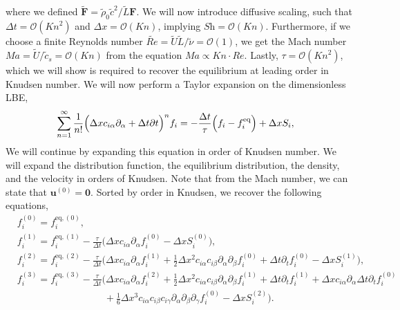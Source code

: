 \documentclass[fleqn,a4paper]{article} %
\numberwithin{equation}{section} %
\numberwithin{figure}{section} %
\numberwithin{table}{section} %
\numberwithin{algorithm}{section} %
\begin{document}
where we defined $\tilde{\bm{F}} = \tilde{\rho}_0 \tilde{c}^2 / \tilde{L} \bm{F}$. We will now introduce diffusive scaling, such that $\Delta t = \mathcal{O}\left(\textit{Kn}^2\right)$ and $\Delta x = \mathcal{O}\left(\textit{Kn}\right)$, implying $\textit{Sh} = \mathcal{O}\left(\textit{Kn}\right)$. Furthermore, if we choose a finite Reynolds number $\tilde{Re} = \tilde{U} \tilde{L} / \tilde{\nu} = \mathcal{O}\left(1\right)$, we get the Mach number $\textit{Ma} = \tilde{U} / \tilde{c}_s = \mathcal{O}\left(\textit{Kn}\right)$ from the equation $\textit{Ma} \propto \textit{Kn}\cdot \textit{Re}$. Lastly, $\tau = \mathcal{O}\left(\textit{Kn}^2\right)$, which we will show is required to recover the equilibrium at leading order in Knudsen number. We will now perform a Taylor expansion on the dimensionless LBE,
\begin{equation}\label{eq:Taylor expansion LBE}
\begin{split}
    &\sum_{n=1}^\infty \frac{1}{n!}\Bigl(\Delta x c_{i\alpha} \partial_\alpha + \Delta t \partial t\Bigr)^n f_i=-\frac{\Delta t}{\tau}\Bigl(f_i  - f^\text{eq}_i\Bigr) + \Delta xS_i,
\end{split}
\end{equation}
We will continue by expanding this equation in order of Knudsen number. We will expand the distribution function, the equilibrium distribution, the density, and the velocity in orders of Knudsen. Note that from the Mach number, we can state that $\bm{u}^{(0)} = \bm{0}$. Sorted by order in Knudsen, we recover the following equations,
\begin{equation}\label{eq:asymptotic expansion lbe}
\begin{split}
    &f_i^{(0)} = f_i^{\text{eq},(0)},\\
    &f_i^{(1)} = f_i^{\text{eq},(1)} - \frac{\tau}{\Delta t}\Biggl(\Delta x c_{i\alpha}\partial_\alpha f_i^{(0)}-\Delta xS_i^{(0)}\Biggr),\\
    &f_i^{(2)} = f_i^{\text{eq},(2)} - \frac{\tau}{\Delta t}\Biggl(\Delta x c_{i\alpha}\partial_\alpha f_i^{(1)} + \frac{1}{2}\Delta x^2 c_{i\alpha}c_{i\beta}\partial_\alpha\partial_\beta f_i^{(0)} + \Delta t \partial_t f_i^{(0)} - \Delta xS_i^{(1)}\Biggr),\\
    &f_i^{(3)} = f_i^{\text{eq},(3)} -\frac{\tau}{\Delta t}\Biggl(\Delta x c_{i\alpha}\partial_\alpha f_i^{(2)} + \frac{1}{2}\Delta x^2 c_{i\alpha}c_{i\beta}\partial_\alpha\partial_\beta f_i^{(1)}+ \Delta t \partial_t f_i^{(1)} + \Delta x  c_{i\alpha}\partial_\alpha \Delta t\partial_t f_i^{(0)}\\
    &\qquad \qquad\qquad\qquad\quad  + \frac{1}{6}\Delta x^3 c_{i\alpha}c_{i\beta}c_{i\gamma}\partial_\alpha\partial_\beta\partial_\gamma f_i^{(0)}-\Delta xS_i^{(2)}\Biggr).\\
\end{split}
\end{equation}
\end{document}
